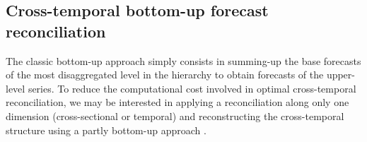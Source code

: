 \documentclass[review, 11pt]{elsarticle}
\theoremstyle{definition}
\begin{document}
\subsection{Cross-temporal bottom-up forecast reconciliation}\label{ssec:ctbu}

The classic bottom-up approach \citep{dunn1976, dangerfield1992} simply consists in summing-up the base forecasts of the most disaggregated level in the hierarchy to obtain forecasts of the upper-level series. To reduce the computational cost involved in optimal cross-temporal reconciliation, we may be interested in applying a reconciliation along only one dimension (cross-sectional or temporal) and reconstructing the cross-temporal structure using a partly bottom-up approach \citep{difonzo2022b, difonzo2023a, sanguri2022}.

\begin{figure}[!t]
	\centering


\end{figure}
\end{document}
